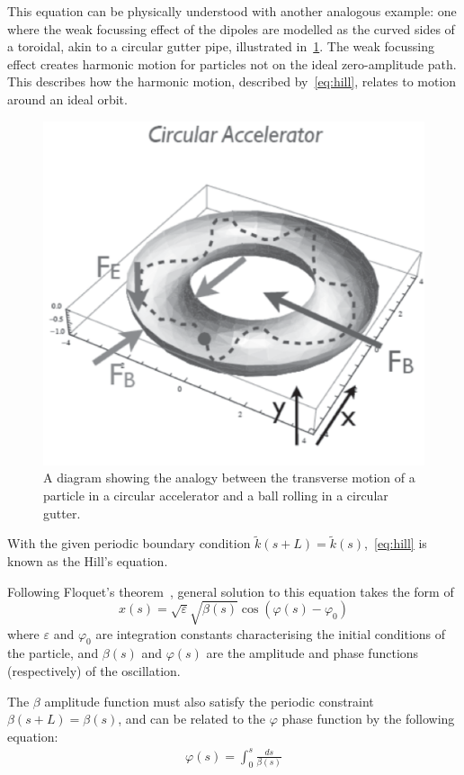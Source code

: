 \documentclass[11pt]{report}
\begin{document}
This equation can be physically understood with another analogous example: one where the weak focussing effect of the dipoles are modelled as the curved sides of a toroidal, akin to a circular gutter pipe, illustrated in~\ref{fig:guttering}. The weak focussing effect creates harmonic motion for particles not on the ideal zero-amplitude path. This describes how the harmonic motion, described by~\autoref{eq:hill}, relates to motion around an ideal orbit.

\begin{figure}[h]
  \centering
  \includegraphics*[width=0.6\linewidth]{guttering}
  \caption{A diagram showing the analogy between the transverse motion of a particle in a circular accelerator and a ball rolling in a circular gutter.}\label{fig:guttering}
\end{figure}

With the given periodic boundary condition $\tilde k(s+L)=\tilde{k}(s)$,~\ref{eq:hill} is known as the Hill's equation. 

Following Floquet's theorem~\cite{Rossbach:247501}, general solution to this equation takes the form of
\begin{equation}
x(s) =\sqrt{\varepsilon}\sqrt{\beta(s)}\cos(\varphi(s)-\varphi_0)
\label{eq:motion_x}
\end{equation} where $\varepsilon$ and $\varphi_0$ are integration constants characterising the initial conditions of the particle, and $\beta(s)$ and $\varphi(s)$ are the amplitude and phase functions (respectively) of the oscillation.

The $\beta$ amplitude function must also satisfy the periodic constraint $\beta(s+L)=\beta(s)$, and can be related to the $\varphi$ phase function by the following equation:
\begin{eqnarray}
  \varphi(s) = \int^s_0\frac{ds}{\beta(s)}
  \label{eq:phase_and_beta}
\end{eqnarray}
\end{document}

